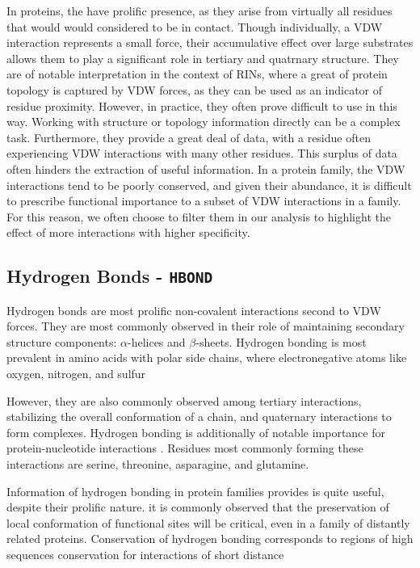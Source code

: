 In proteins, the have prolific presence, as they arise from virtually all residues that would would considered to be in contact. Though individually, a VDW interaction represents a small force, their accumulative effect over large substrates allows them to play a significant role in tertiary and quatrnary structure. 
They are of notable interpretation in the context of RINs, where a great of protein topology is captured by VDW forces, as they can be used as an indicator of residue proximity. However, in practice, they often prove difficult to use in this way. Working with structure or topology information directly can be a complex task. Furthermore, they provide a great deal of data, with a residue often experiencing VDW interactions with many other residues. This surplus of data often hinders the extraction of useful information. 
In a protein family, the VDW interactions tend to be poorly conserved, and given their abundance, it is difficult to prescribe functional importance to a subset of VDW interactions in a family. For this reason, we often choose to filter them in our analysis to highlight the effect of more interactions with higher specificity.

\subsection{Hydrogen Bonds - \texttt{HBOND}}
Hydrogen bonds are most prolific non-covalent interactions second to VDW forces. They are most commonly observed 
in their role of maintaining secondary structure components: $\alpha$-helices and $\beta$-sheets. 
Hydrogen bonding is most prevalent in amino acids with polar side chains, where electronegative atoms like oxygen, nitrogen, and sulfur

However, they are also commonly observed among tertiary interactions, stabilizing the overall conformation of a chain, and quaternary interactions to form complexes. Hydrogen bonding is additionally of notable importance for protein-nucleotide interactions \cite{}. 
Residues most commonly forming these interactions are serine, threonine, asparagine, and glutamine. \cite{}

Information of hydrogen bonding in protein families provides is quite useful, despite their prolific nature. 
it is commonly observed that the preservation of local conformation of functional sites will be critical, even in a family of distantly related proteins. Conservation of hydrogen bonding corresponds to regions of high sequences conservation for interactions of short distance
